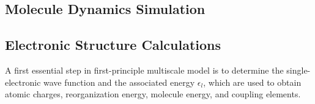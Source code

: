 \documentclass[letterpaper,12pt]{article}
\begin{document}
\subsection{Molecule Dynamics Simulation}

\subsection{Electronic Structure Calculations} 
A first essential step in first-principle multiscale model is to determine the single-electronic wave function and the associated energy $\epsilon_l$, which are used to obtain atomic charges, reorganization energy, molecule energy, and coupling elements.
\end{document}
